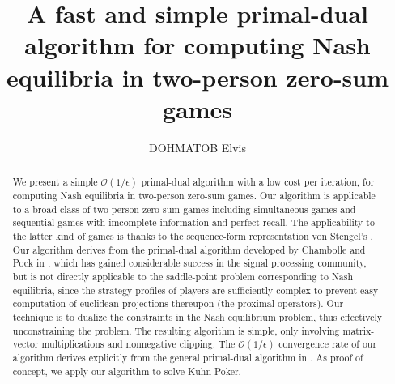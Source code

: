 \documentclass{article} %
\author{
DOHMATOB Elvis \inst[1]}
\title{A fast and simple primal-dual algorithm for computing Nash equilibria in two-person zero-sum games}
\begin{document}
\maketitle

\begin{abstract}
We present a simple $\mathcal{O}(1/\epsilon)$ primal-dual algorithm with a low cost per iteration, for computing Nash equilibria in two-person zero-sum games. Our algorithm is applicable to a broad class of two-person zero-sum games including simultaneous games and sequential games with imcomplete information and perfect recall. The applicability to the latter kind of games is thanks to the sequence-form representation von Stengel's \cite{von1996efficient}. Our algorithm derives from the primal-dual algorithm developed by Chambolle and Pock in \cite{chambolle2010}, which has gained considerable success in the signal processing community, but is not directly applicable to the saddle-point problem corresponding to Nash equilibria, since the strategy profiles of players are sufficiently complex
 to prevent easy computation 
of euclidean
 projections thereupon (the proximal operators).
Our technique is to dualize the constraints in the Nash equilibrium problem, thus effectively unconstraining the problem. The resulting algorithm is simple, only involving matrix-vector multiplications
and nonnegative clipping.
The $\mathcal{O}(1/\epsilon)$ convergence rate of our algorithm derives explicitly from the general primal-dual algorithm in \cite{chambolle2010}. As proof of concept, we apply our algorithm to solve Kuhn Poker.
\end{abstract}
\end{document}
